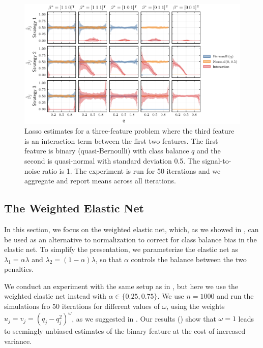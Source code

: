 \begin{figure}[htpb]
  \label{fig:interactions}
  \centering
  \includegraphics[]{plots/interactions-classbalance.pdf}
  \caption{%
    Lasso estimates for a three-feature problem where the third feature is an
    interaction term between the first two features. The first feature is
    binary (quasi-Bernoulli) with class balance \(q\) and the second is
    quasi-normal with standard deviation 0.5. The signal-to-noise ratio is 1.
    The experiment is run for 50 iterations and we aggregate and report means
    across all iterations.
  }
\end{figure}

\subsection{The Weighted Elastic Net}\label{sec:experiments-elasticnet}

In this section, we focus on the weighted elastic net, which, as we showed in
, can be used as an alternative to normalization to correct
for class balance bias in the elastic net. To simplify the presentation, we parameterize
the elastic net as \(\lambda_1 = \alpha \lambda \) and \(\lambda_2 = (1-\alpha) \lambda\),
so that \(\alpha\) controls the balance between the two penalties.

We conduct an experiment with the same setup as in , but
here we use the weighted elastic net instead with \(\alpha \in \{0.25, 0.75\}\). We use
\(n=1000\) and run the simulations fro 50 iterations for different values of \(\omega\),
using the weights \(u_j = v_j = (q_j - q_j^2)^{\omega}\), as we suggested in
. Our results () show that \(\omega =
1\) leads to seemingly unbiased estimates of the binary feature at the cost of increased
variance.

